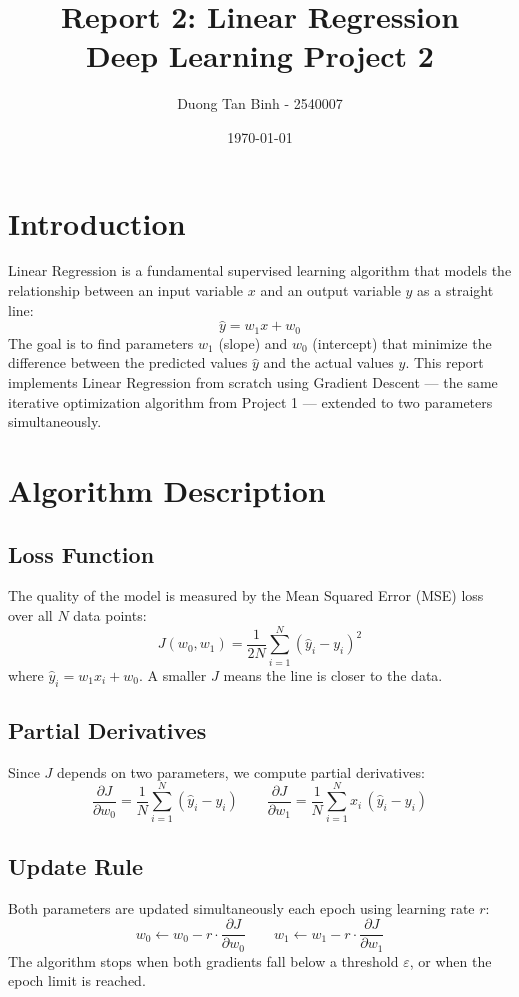 \documentclass[12pt,a4paper]{article}
\title{\textbf{Report 2: Linear Regression} \\ \large Deep Learning Project 2}
\author{Duong Tan Binh - 2540007}
\date{\today}
\begin{document}
\maketitle
\tableofcontents
\newpage

\section{Introduction}

Linear Regression is a fundamental supervised learning algorithm that models the relationship between an input variable $x$ and an output variable $y$ as a straight line:
\[
    \hat{y} = w_1 x + w_0
\]
The goal is to find parameters $w_1$ (slope) and $w_0$ (intercept) that minimize the difference between the predicted values $\hat{y}$ and the actual values $y$. This report implements Linear Regression from scratch using Gradient Descent --- the same iterative optimization algorithm from Project 1 --- extended to two parameters simultaneously.

\section{Algorithm Description}

\subsection{Loss Function}

The quality of the model is measured by the Mean Squared Error (MSE) loss over all $N$ data points:
\[
    J(w_0, w_1) = \frac{1}{2N} \sum_{i=1}^{N} (\hat{y}_i - y_i)^2
\]
where $\hat{y}_i = w_1 x_i + w_0$. A smaller $J$ means the line is closer to the data.

\subsection{Partial Derivatives}

Since $J$ depends on two parameters, we compute partial derivatives:
\[
    \frac{\partial J}{\partial w_0} = \frac{1}{N} \sum_{i=1}^{N} (\hat{y}_i - y_i)
    \qquad
    \frac{\partial J}{\partial w_1} = \frac{1}{N} \sum_{i=1}^{N} x_i\,(\hat{y}_i - y_i)
\]

\subsection{Update Rule}

Both parameters are updated simultaneously each epoch using learning rate $r$:
\[
    w_0 \leftarrow w_0 - r \cdot \frac{\partial J}{\partial w_0}
    \qquad
    w_1 \leftarrow w_1 - r \cdot \frac{\partial J}{\partial w_1}
\]
The algorithm stops when both gradients fall below a threshold $\varepsilon$, or when the epoch limit is reached.
\end{document}
